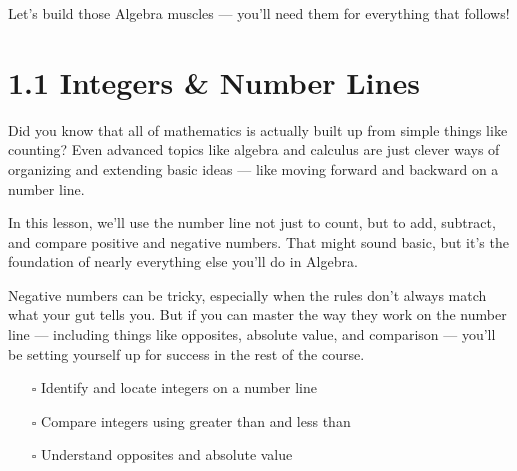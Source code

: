 \documentclass[
  letterpaper,
]{scrrept}
\providecommand{\tightlist}{%
  \setlength{\itemsep}{0pt}\setlength{\parskip}{0pt}}
\begin{document}
Let's build those Algebra muscles --- you'll need them for everything
that follows!

\chapter*{1.1 Integers \& Number Lines}\label{integers-number-lines}


Did you know that all of mathematics is actually built up from simple
things like counting? Even advanced topics like algebra and calculus are
just clever ways of organizing and extending basic ideas --- like moving
forward and backward on a number line.

In this lesson, we'll use the number line not just to count, but to add,
subtract, and compare positive and negative numbers. That might sound
basic, but it's the foundation of nearly everything else you'll do in
Algebra.

Negative numbers can be tricky, especially when the rules don't always
match what your gut tells you. But if you can master the way they work
on the number line --- including things like opposites, absolute value,
and comparison --- you'll be setting yourself up for success in the rest
of the course.

\begin{tcolorbox}[enhanced jigsaw, colframe=quarto-callout-note-color-frame, opacitybacktitle=0.6, arc=.35mm, coltitle=black, leftrule=.75mm, toprule=.15mm, opacityback=0, bottomrule=.15mm, breakable, title={🎯 Objectives}, colback=white, bottomtitle=1mm, toptitle=1mm, titlerule=0mm, rightrule=.15mm, left=2mm, colbacktitle=quarto-callout-note-color!10!white]

\begin{itemize}
\tightlist
\item[$\square$]
  Identify and locate integers on a number line\\
\item[$\square$]
  Compare integers using greater than and less than\\
\item[$\square$]
  Understand opposites and absolute value\\
\end{itemize}

\end{tcolorbox}
\end{document}
